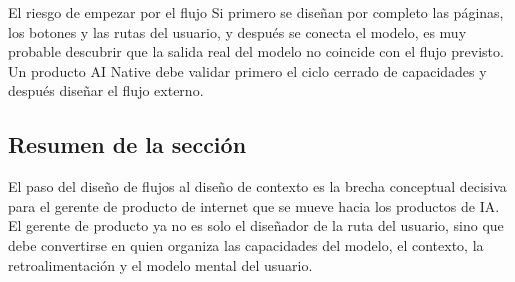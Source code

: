 \begin{warningbox}{El riesgo de empezar por el flujo}
Si primero se diseñan por completo las páginas, los botones y las rutas del usuario, y después se conecta el modelo, es muy probable descubrir que la salida real del modelo no coincide con el flujo previsto. Un producto AI Native debe validar primero el ciclo cerrado de capacidades y después diseñar el flujo externo.
\end{warningbox}

\subsection{Resumen de la sección}

El paso del diseño de flujos al diseño de contexto es la brecha conceptual decisiva para el gerente de producto de internet que se mueve hacia los productos de IA. El gerente de producto ya no es solo el diseñador de la ruta del usuario, sino que debe convertirse en quien organiza las capacidades del modelo, el contexto, la retroalimentación y el modelo mental del usuario.
